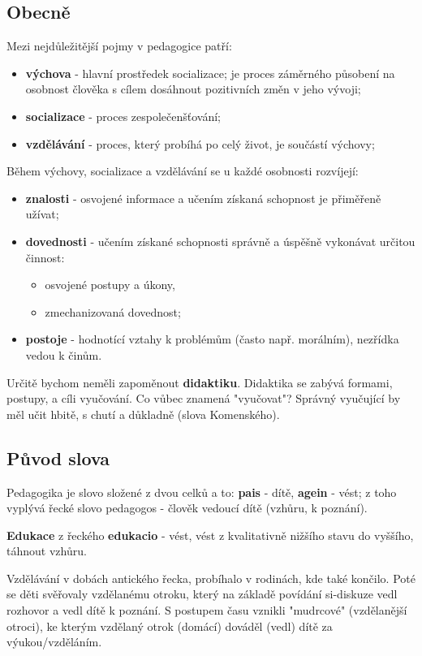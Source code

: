 \documentclass[a4paper,12pt]{report}
\begin{document}
\begin{samepage}
\subsection*{Obecně}
Mezi nejdůležitější pojmy v pedagogice patří:
\begin{itemize} 
 \item \textbf{výchova} - hlavní prostředek socializace; je proces záměrného působení na osobnost člověka s cílem dosáhnout pozitivních změn v jeho vývoji;
 \item \textbf{socializace} - proces zespolečenšťování;
 \item \textbf{vzdělávání} - proces, který probíhá po celý život, je součástí výchovy;
\end{itemize}

Během výchovy, socializace a vzdělávání se u každé osobnosti rozvíjejí:
\begin{itemize} 
 \item \textbf{znalosti} - osvojené informace a učením získaná schopnost je přiměřeně užívat;
 \item \textbf{dovednosti} - učením získané schopnosti správně a úspěšně vykonávat určitou činnost:
 \begin{itemize}
  \item osvojené postupy a úkony,
  \item zmechanizovaná dovednost;
 \end{itemize}
 \item \textbf{postoje} - hodnotící vztahy k problémům (často např. morálním), nezřídka vedou k činům.
\end{itemize}

Určitě bychom neměli zapoměnout \textbf{didaktiku}. Didaktika se zabývá formami, postupy, a cíli vyučování. Co vůbec znamená "vyučovat"? Správný vyučující by měl učit hbitě, s chutí a důkladně (slova Komenského). 
\end{samepage}

\begin{samepage}
\subsection*{Původ slova}
Pedagogika je slovo složené z dvou celků a to: \textbf{pais} - dítě, \textbf{agein} - vést; z toho vyplývá řecké slovo pedagogos - člověk vedoucí dítě (vzhůru, k poznání).

\textbf{Edukace} z řeckého \textbf{edukacio} - vést, vést z kvalitativně nižšího stavu do vyššího, táhnout vzhůru.

Vzdělávání v dobách antického řecka, probíhalo v rodinách, kde také končilo. Poté se děti svěřovaly vzdělanému otroku, který na základě povídání si-diskuze vedl rozhovor a vedl dítě k poznání. S postupem času vznikli "mudrcové" (vzdělanější otroci), ke kterým vzdělaný otrok (domácí) dováděl (vedl) dítě za výukou/vzděláním.
\end{samepage}
\end{document}
